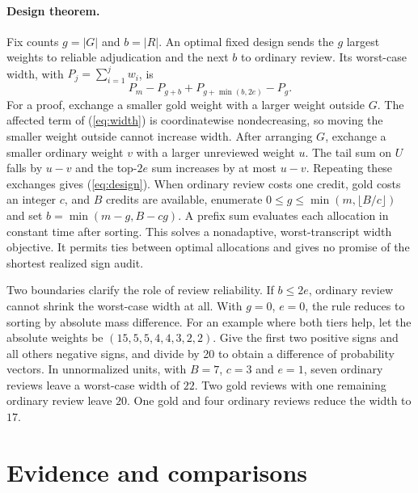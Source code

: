 \documentclass[11pt]{article}
\begin{document}
\paragraph{Design theorem.}
Fix counts $g=|G|$ and $b=|R|$. An optimal fixed design sends the $g$ largest weights to reliable adjudication and the next $b$ to ordinary review. Its worst-case width, with $P_j=\sum_{i=1}^j w_i$, is
\begin{equation}
 P_m-P_{g+b}+P_{g+\min(b,2e)}-P_g. \label{eq:design}
\end{equation}
For a proof, exchange a smaller gold weight with a larger weight outside $G$. The affected term of (\ref{eq:width}) is coordinatewise nondecreasing, so moving the smaller weight outside cannot increase width. After arranging $G$, exchange a smaller ordinary weight $v$ with a larger unreviewed weight $u$. The tail sum on $U$ falls by $u-v$ and the top-$2e$ sum increases by at most $u-v$. Repeating these exchanges gives (\ref{eq:design}). When ordinary review costs one credit, gold costs an integer $c$, and $B$ credits are available, enumerate $0\leq g\leq\min(m,\lfloor B/c\rfloor)$ and set $b=\min(m-g,B-cg)$. A prefix sum evaluates each allocation in constant time after sorting. This solves a nonadaptive, worst-transcript width objective. It permits ties between optimal allocations and gives no promise of the shortest realized sign audit.

Two boundaries clarify the role of review reliability. If $b\leq2e$, ordinary review cannot shrink the worst-case width at all. With $g=0$, $e=0$, the rule reduces to sorting by absolute mass difference. For an example where both tiers help, let the absolute weights be $(15,5,5,4,4,3,2,2)$. Give the first two positive signs and all others negative signs, and divide by 20 to obtain a difference of probability vectors. In unnormalized units, with $B=7$, $c=3$ and $e=1$, seven ordinary reviews leave a worst-case width of $22$. Two gold reviews with one remaining ordinary review leave $20$. One gold and four ordinary reviews reduce the width to $17$.



\section{Evidence and comparisons}



\end{document}

